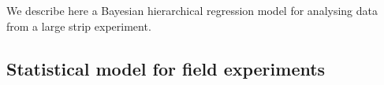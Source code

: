 \documentclass[a4paper]{article}   	%
\begin{document}
	
	We describe here a Bayesian hierarchical regression model for analysing data from a large strip experiment.
	
	\subsection{Statistical model for field experiments}\label{sec:fieldmodel}
	
\end{document}
